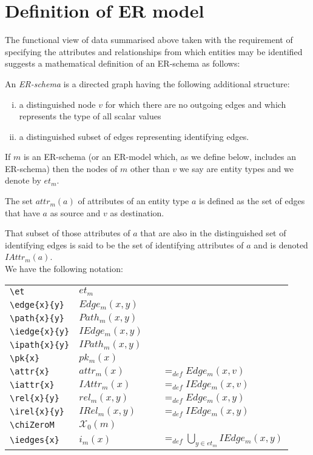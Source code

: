 \documentclass[10pt,a4paper]{article}
\newcommand{\genericmodel}{\mathcal{M}}
\renewcommand{\genericmodel}{{m}}
\newcommand{\chiZero}{\mathcal{X}_0}
\newcommand{\chiZeroM}{\chiZero(\genericmodel)}
\newcommand{\veee}{v}
\newcommand{\et}[1][\genericmodel]{et_{#1}}
\newcommand{\edge}[3][\genericmodel]{Edge_{#1}(#2,#3)}
\newcommand{\iedge}[3][\genericmodel]{IEdge_{#1}(#2,#3)}
\newcommand{\path}[3][\genericmodel]{Path_{#1}(#2,#3)}
\newcommand{\ipath}[3][\genericmodel]{IPath_{#1}(#2,#3)}
\newcommand{\attr}[2] [\genericmodel]{attr_{#1}(#2)}
\newcommand{\iattr}[2] [\genericmodel]{IAttr_{#1}(#2)}
\newcommand{\rel}[3][\genericmodel]{rel_{#1}(#2,#3)}
\newcommand{\irel}[3][\genericmodel]{IRel_{#1}(#2,#3)}
\newcommand{\iedges}[2] [\genericmodel]{i_{#1}(#2)}
\newcommand{\pk}[2] [\genericmodel]{pk_{#1}(#2)}
\newcommand{\term}[1]{\textit{{#1}}}
\begin{document}
\section{Definition of ER model}
The functional view of data summarised above taken with the requirement of specifying the attributes and relationships from which entities may be identified suggests a mathematical definition of an ER-schema  as  follows:

\begin{definition}
An \term{ER-schema} is a directed graph having the following additional structure:

\begin{enumerate} [(i)]
\item{a distinguished node $\veee$ for which there are no outgoing edges and which represents the type of all scalar values }

\item{a distinguished subset  of edges representing identifying edges.  
}
\end{enumerate}
\end{definition}



\noindent If $\genericmodel$ is an ER-schema (or an ER-model which, as we define below, 
includes an ER-schema) then the nodes of $\genericmodel$ other than $\veee$ we say are entity types and we denote by $\et$.

\noindent
The set $\attr{a}$ of attributes of an entity type $a$ is defined as the set of edges that have $a$ as source and  $\veee$ as destination. 


\noindent That subset of those attributes of $a$ that are also in the distinguished set of identifying edges is said 
to be the set of identifying attributes of $a$  and is denoted $\iattr{a}$.\\

\noindent We have the following notation:

\begin{tabular}{l l p{0.5cm} l }
\verb'\et'          & $\et$ \\
\verb'\edge{x}{y}'  & $\edge{x}{y}$ \\
\verb'\path{x}{y}'  & $\path{x}{y}$ \\
\verb'\iedge{x}{y}' & $\iedge{x}{y}$ \\
\verb'\ipath{x}{y}' & $\ipath{x}{y}$ \\
\verb'\pk{x}'       & $\pk{x} $      \\
\verb'\attr{x}'     & $\attr{x} $  &       & $=_{def} \edge{x}{\veee}$ \\
\verb'\iattr{x}'    & $\iattr{x} $ &       & $=_{def} \iedge{x}{\veee}$ \\
\verb'\rel{x}{y}'   & $\rel{x}{y}$  &      & $=_{def} \edge{x}{y}$ \\
\verb'\irel{x}{y}'  & $\irel{x}{y}$ &      & $=_{def} \iedge{x}{y}$ \\
\verb'\chiZeroM'    & $\chiZeroM  $ &      &                        \\
\verb'\iedges{x}'   & $\iedges{x} $ &      & $=_{def} \bigcup_{y \in \et}\iedge{x}{y}$
\end{tabular}
\end{document}

